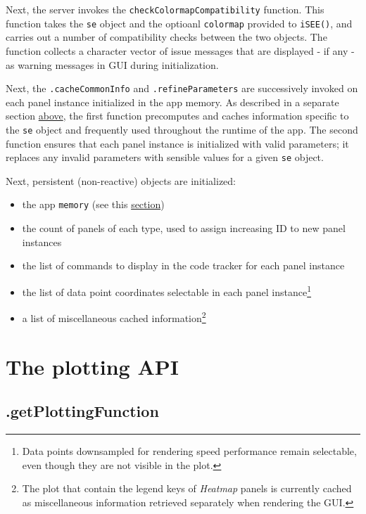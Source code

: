 \documentclass[]{book}
\providecommand{\tightlist}{%
  \setlength{\itemsep}{0pt}\setlength{\parskip}{0pt}}
\let\rmarkdownfootnote\footnote%
\def\footnote{\protect\rmarkdownfootnote}
\begin{document}
Next, the server invokes the \texttt{checkColormapCompatibility} function.
This function takes the \texttt{se} object and the optioanl \texttt{colormap} provided to \texttt{iSEE()}, and carries out a number of compatibility checks between the two objects.
The function collects a character vector of issue messages that are displayed - if any - as warning messages in GUI during initialization.

Next, the \texttt{.cacheCommonInfo} and \texttt{.refineParameters} are successively invoked on each panel instance initialized in the app memory.
As described in a separate section \protect\hyperlink{panel-api}{above}, the first function precomputes and caches information specific to the \texttt{se} object and frequently used throughout the runtime of the app.
The second function ensures that each panel instance is initialized with valid parameters; it replaces any invalid parameters with sensible values for a given \texttt{se} object.

Next, persistent (non-reactive) objects are initialized:

\begin{itemize}
\tightlist
\item
  the app \texttt{memory} (see this \protect\hyperlink{memory}{section})
\item
  the count of panels of each type, used to assign increasing ID to new panel instances
\item
  the list of commands to display in the code tracker for each panel instance
\item
  the list of data point coordinates selectable in each panel instance\footnote{Data points downsampled for rendering speed performance remain selectable, even though they are not visible in the plot.}
\item
  a list of miscellaneous cached information\footnote{The plot that contain the legend keys of \emph{Heatmap} panels is currently cached as miscellaneous information retrieved separately when rendering the GUI.}
\end{itemize}

\hypertarget{plotting}{%
\chapter{The plotting API}\label{plotting}}

\hypertarget{getplottingfunction}{%
\section{.getPlottingFunction}\label{getplottingfunction}}
\end{document}
